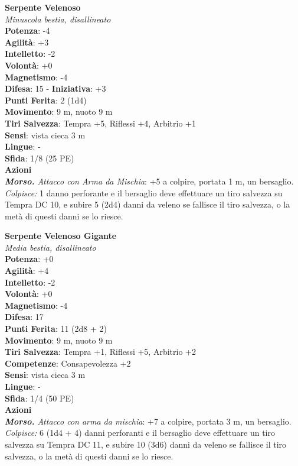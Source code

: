 \begin{multicols}{2}
\medskip\textbf{Serpente Velenoso}\\
\emph{Minuscola bestia, disallineato}\\
\textbf{Potenza}: -4\\
\textbf{Agilità}: +3\\
\textbf{Intelletto}: -2\\
\textbf{Volontà}: +0\\
\textbf{Magnetismo}: -4\\
\textbf{Difesa}: 15 - \textbf{Iniziativa}: +3\\
\textbf{Punti Ferita}: 2 (1d4)\\
\textbf{Movimento}: 9 m, nuoto 9 m\\
\textbf{Tiri Salvezza}: Tempra +5, Riflessi +4, Arbitrio +1\\
\textbf{Sensi}: vista cieca 3 m\\
\textbf{Lingue}: -\\
\textbf{Sfida}: 1/8 (25 PE)\smallskip\\
\smallskip\textbf{Azioni}\\
\emph{\textbf{Morso.} Attacco con Arma da Mischia}: +5 a colpire, portata 1 m, un bersaglio.\\
\emph{Colpisce:} 1 danno perforante e il bersaglio deve effettuare un tiro salvezza su Tempra DC 10, e subire 5 (2d4) danni da veleno se fallisce il tiro salvezza, o la metà di questi danni se lo riesce.

\medskip\textbf{Serpente Velenoso Gigante}\\
\emph{Media bestia, disallineato}\\
\textbf{Potenza}: +0\\
\textbf{Agilità}: +4\\
\textbf{Intelletto}: -2\\
\textbf{Volontà}: +0\\
\textbf{Magnetismo}: -4\\
\textbf{Difesa}: 17\\
\textbf{Punti Ferita}: 11 (2d8 + 2)\\
\textbf{Movimento}: 9 m, nuoto 9 m\\
\textbf{Tiri Salvezza}: Tempra +1, Riflessi +5, Arbitrio +2\\
\textbf{Competenze}: Consapevolezza +2\\
\textbf{Sensi}: vista cieca 3 m\\
\textbf{Lingue}: -\\
\textbf{Sfida}: 1/4 (50 PE)\smallskip\\
\smallskip\textbf{Azioni}\\
\emph{\textbf{Morso.} Attacco con arma da mischia}: +7 a colpire, portata 3 m, un bersaglio.\\
\emph{Colpisce:} 6 (1d4 + 4) danni perforanti e il bersaglio deve effettuare un tiro salvezza su Tempra DC 11, e subire 10 (3d6) danni da veleno se fallisce il tiro salvezza, o la metà di questi danni se lo riesce.\\


\end{multicols}

